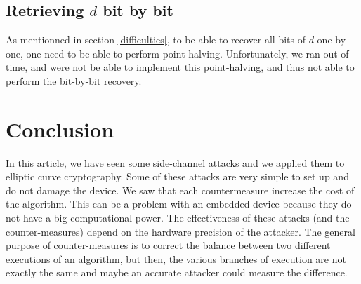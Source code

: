 \documentclass[journal]{IEEEtran}
\begin{document}
\subsection{Retrieving $d$ bit by bit}
As mentionned in section \ref{difficulties}, to be able to recover all bits of $d$ one by one, one need to be able to perform point-halving.
Unfortunately, we ran out of time, and were not be able to implement this point-halving, and thus not able to perform the bit-by-bit recovery.

\section{Conclusion}

In this article, we have seen some side-channel attacks and we applied them to elliptic curve cryptography. Some of these attacks are very simple to set up and do not damage the device. We saw that each countermeasure increase the cost of the algorithm. This can be a problem with an embedded device because they do not have a big computational power. The effectiveness of these attacks (and the counter-measures) depend on the hardware precision of the attacker. The general purpose of counter-measures is to correct the balance between two different executions of an algorithm, but then, the various branches of execution are not exactly the same and maybe an accurate attacker could measure the difference.

\clearpage




%
\end{document}
